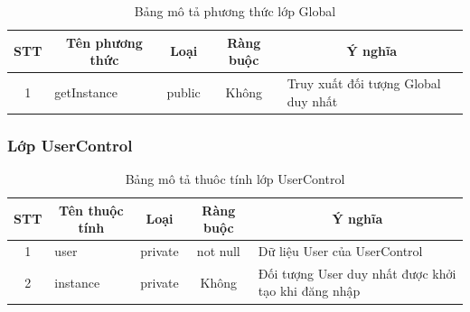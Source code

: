 \documentclass[a4paper, 12pt]{article}
\begin{document}
\begin{table}[H]
	\begin{center}
		\begin{tabular}{|c|l|c|c|l|}
			\hline
			STT & \multicolumn{1}{c|}{Tên phương thức} & Loại   & \multicolumn{1}{c|}{Ràng buộc} & \multicolumn{1}{c|}{Ý nghĩa}        \\ \hline
			1   & getInstance                          & public & Không                               & Truy xuất đối tượng Global duy nhất \\ \hline
		\end{tabular}
		\caption{Bảng mô tả phương thức lớp Global}
	\end{center}
\end{table}

\subsubsection{Lớp UserControl}

\begin{table}[H]
	\begin{center}
		\begin{tabular}{|c|l|c|c|l|}
			\hline
			STT & \multicolumn{1}{c|}{Tên thuộc tính} & Loại                         & \multicolumn{1}{c|}{Ràng buộc} & \multicolumn{1}{c|}{Ý nghĩa}                        \\ \hline
			1   & user                                & private                      & not null                       & Dữ liệu User của UserControl                        \\ \hline
			2   & instance                            & \multicolumn{1}{l|}{private} &          Không                      & Đối tượng User duy nhất được khởi tạo khi đăng nhập \\ \hline
		\end{tabular}
		\caption{Bảng mô tả thuôc tính lớp UserControl}
	\end{center}
\end{table}
\end{document}
